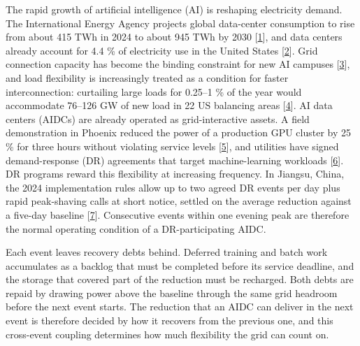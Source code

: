 \documentclass[a4paper,twocolumn,fleqn,10pt]{article}
\begin{document}
The rapid growth of artificial intelligence (AI) is reshaping electricity demand. The International Energy Agency projects global data-center consumption to rise from about 415 TWh in 2024 to about 945 TWh by 2030 [\hyperlink{ref1}{1}], and data centers already account for 4.4 \% of electricity use in the United States [\hyperlink{ref2}{2}]. Grid connection capacity has become the binding constraint for new AI campuses [\hyperlink{ref3}{3}], and load flexibility is increasingly treated as a condition for faster interconnection: curtailing large loads for 0.25--1 \% of the year would accommodate 76--126 GW of new load in 22 US balancing areas [\hyperlink{ref4}{4}]. AI data centers (AIDCs) are already operated as grid-interactive assets. A field demonstration in Phoenix reduced the power of a production GPU cluster by 25 \% for three hours without violating service levels [\hyperlink{ref5}{5}], and utilities have signed demand-response (DR) agreements that target machine-learning workloads [\hyperlink{ref6}{6}]. DR programs reward this flexibility at increasing frequency. In Jiangsu, China, the 2024 implementation rules allow up to two agreed DR events per day plus rapid peak-shaving calls at short notice, settled on the average reduction against a five-day baseline [\hyperlink{ref7}{7}]. Consecutive events within one evening peak are therefore the normal operating condition of a DR-participating AIDC.

Each event leaves recovery debts behind. Deferred training and batch work accumulates as a backlog that must be completed before its service deadline, and the storage that covered part of the reduction must be recharged. Both debts are repaid by drawing power above the baseline through the same grid headroom before the next event starts. The reduction that an AIDC can deliver in the next event is therefore decided by how it recovers from the previous one, and this cross-event coupling determines how much flexibility the grid can count on.
\end{document}
